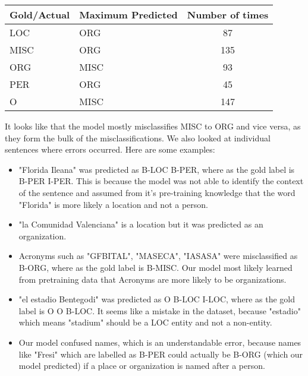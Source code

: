 \documentclass[12pt]{report}
\begin{document}
\begin{table}[H]
	\centering
	\begin{tabular}{|l|l|c|}
		\hline
		\textbf{Gold/Actual} & \textbf{Maximum Predicted} & \textbf{Number of times} \\ \hline
		LOC                  & ORG                        & 87                       \\ \hline
		MISC                 & ORG                        & 135                      \\ \hline
		ORG                  & MISC                       & 93                       \\ \hline
		PER                  & ORG                        & 45                       \\ \hline
		O                    & MISC                       & 147                      \\ \hline
	\end{tabular}
\end{table}

It looks like that the model mostly misclassifies MISC to ORG and vice versa, as they form the bulk of the misclassifications. We also looked at individual sentences where errors occurred. Here are some examples:

\begin{itemize}
	\item "Florida Ileana" was predicted as B-LOC B-PER, where as the gold label is B-PER I-PER. This is because the model was not able to identify the context of the sentence and assumed from it's pre-training knowledge that the word "Florida" is more likely a location and not a person.
	\item "la Comunidad Valenciana" is a location but it was predicted as an organization.
	\item Acronyms such as "GFBITAL", "MASECA", "IASASA" were misclassified as B-ORG, where as the gold label is B-MISC. Our model most likely learned from pretraining data that Acronyms are more likely to be organizations.
	\item "el estadio Bentegodi" was predicted as O B-LOC I-LOC, where as the gold label is O O B-LOC. It seems like a mistake in the dataset, because "estadio" which means "stadium" should be a LOC entity and not a non-entity.
	\item Our model confused names, which is an understandable error, because names like "Fresi" which are labelled as B-PER could actually be B-ORG (which our model predicted) if a place or organization is named after a person.
\end{itemize}
\end{document}
